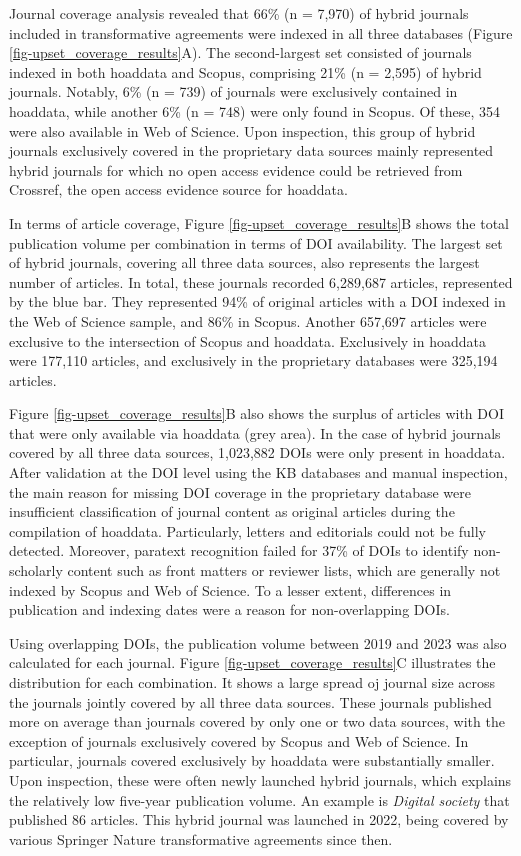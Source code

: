 \documentclass[a4paper,man,floatsintext,longtable,noextraspace,10pt]{apa6}
\begin{document}
Journal coverage analysis revealed that 66\% (n = 7,970) of hybrid
journals included in transformative agreements were indexed in all three
databases (Figure \ref{fig-upset_coverage_results}A). The second-largest
set consisted of journals indexed in both hoaddata and Scopus,
comprising 21\% (n = 2,595) of hybrid journals. Notably, 6\% (n = 739)
of journals were exclusively contained in hoaddata, while another 6\% (n
= 748) were only found in Scopus. Of these, 354 were also available in
Web of Science. Upon inspection, this group of hybrid journals
exclusively covered in the proprietary data sources mainly represented
hybrid journals for which no open access evidence could be retrieved
from Crossref, the open access evidence source for hoaddata.

In terms of article coverage, Figure \ref{fig-upset_coverage_results}B
shows the total publication volume per combination in terms of DOI
availability. The largest set of hybrid journals, covering all three
data sources, also represents the largest number of articles. In total,
these journals recorded 6,289,687 articles, represented by the blue bar.
They represented 94\% of original articles with a DOI indexed in the Web
of Science sample, and 86\% in Scopus. Another 657,697 articles were
exclusive to the intersection of Scopus and hoaddata. Exclusively in
hoaddata were 177,110 articles, and exclusively in the proprietary
databases were 325,194 articles.

Figure \ref{fig-upset_coverage_results}B also shows the surplus of
articles with DOI that were only available via hoaddata (grey area). In
the case of hybrid journals covered by all three data sources, 1,023,882
DOIs were only present in hoaddata. After validation at the DOI level
using the KB databases and manual inspection, the main reason for
missing DOI coverage in the proprietary database were insufficient
classification of journal content as original articles during the
compilation of hoaddata. Particularly, letters and editorials could not
be fully detected. Moreover, paratext recognition failed for 37\% of
DOIs to identify non-scholarly content such as front matters or reviewer
lists, which are generally not indexed by Scopus and Web of Science. To
a lesser extent, differences in publication and indexing dates were a
reason for non-overlapping DOIs.

Using overlapping DOIs, the publication volume between 2019 and 2023 was
also calculated for each journal. Figure
\ref{fig-upset_coverage_results}C illustrates the distribution for each
combination. It shows a large spread oj journal size across the journals
jointly covered by all three data sources. These journals published more
on average than journals covered by only one or two data sources, with
the exception of journals exclusively covered by Scopus and Web of
Science. In particular, journals covered exclusively by hoaddata were
substantially smaller. Upon inspection, these were often newly launched
hybrid journals, which explains the relatively low five-year publication
volume. An example is \emph{Digital society} that published 86 articles.
This hybrid journal was launched in 2022, being covered by various
Springer Nature transformative agreements since then.
\end{document}
